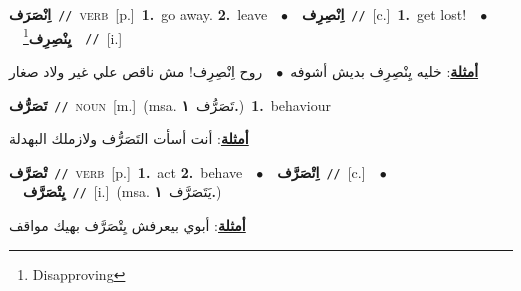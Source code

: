 \documentclass[10pt,a4paper,twoside]{article} %
\begin{document}
\begin{multicols}{2}
{\setlength\topsep{0pt}\textbf{\foreignlanguage{arabic}{اِنْصَرَف}}\ {\color{gray}\texttt{//}\color{black}}\ \textsc{verb}\ [p.]\ \textbf{1.}~go away.  \textbf{2.}~leave\ \ $\bullet$\ \ \setlength\topsep{0pt}\textbf{\foreignlanguage{arabic}{اِنْصِرِف}}\ {\color{gray}\texttt{//}\color{black}}\ [c.]\ \textbf{1.}~get lost!\ \ $\bullet$\ \ \setlength\topsep{0pt}\textbf{\foreignlanguage{arabic}{يِنْصِرِف}}\footnote{Disapproving}\ \ {\color{gray}\texttt{//}\color{black}}\ [i.]\  \begin{flushright}\color{gray}\foreignlanguage{arabic}{\textbf{\underline{\foreignlanguage{arabic}{أمثلة}}}: خليه يِنْصِرِف بديش أشوفه\ $\bullet$\ \  روح اِنْصِرِف! مش ناقص علي غير ولاد صغار}\end{flushright}\color{black}} \vspace{2mm}

{\setlength\topsep{0pt}\textbf{\foreignlanguage{arabic}{تَصَرُّف}}\ {\color{gray}\texttt{//}\color{black}}\ \textsc{noun}\ [m.]\ \color{gray}(msa. \foreignlanguage{arabic}{تَصَرُّف}~\foreignlanguage{arabic}{\textbf{١.}})\color{black}\ \textbf{1.}~behaviour\  \begin{flushright}\color{gray}\foreignlanguage{arabic}{\textbf{\underline{\foreignlanguage{arabic}{أمثلة}}}: أنت أسأت التَصَرُّف ولازملك البهدلة}\end{flushright}\color{black}} \vspace{2mm}

{\setlength\topsep{0pt}\textbf{\foreignlanguage{arabic}{تْصَرَّف}}\ {\color{gray}\texttt{//}\color{black}}\ \textsc{verb}\ [p.]\ \textbf{1.}~act  \textbf{2.}~behave\ \ $\bullet$\ \ \setlength\topsep{0pt}\textbf{\foreignlanguage{arabic}{اِتْصَرَّف}}\ {\color{gray}\texttt{//}\color{black}}\ [c.]\ \ $\bullet$\ \ \setlength\topsep{0pt}\textbf{\foreignlanguage{arabic}{يِتْصَرَّف}}\ {\color{gray}\texttt{//}\color{black}}\ [i.]\ \color{gray}(msa. \foreignlanguage{arabic}{يَتَصَرَّف}~\foreignlanguage{arabic}{\textbf{١.}})\color{black}\  \begin{flushright}\color{gray}\foreignlanguage{arabic}{\textbf{\underline{\foreignlanguage{arabic}{أمثلة}}}: أبوي بيعرفش يِتْصَرَّف بهيك مواقف}\end{flushright}\color{black}} \vspace{2mm}


\end{multicols}
\end{document}

